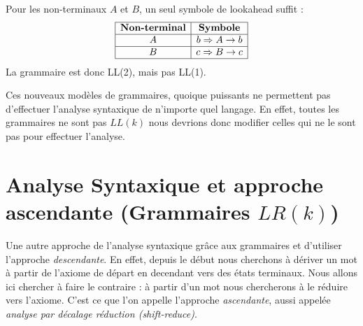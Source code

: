 \begin{example}
        Pour les non-terminaux $A$ et $B$, un seul symbole de lookahead suffit :
        \[
            \begin{array}{|c|c|}
                \hline
                \textbf{Non-terminal} & \textbf{Symbole} \\
                \hline
                A & b \Rightarrow A \to b \\
                \hline
                B & c \Rightarrow B \to c \\
                \hline
            \end{array}
        \]
    La grammaire est donc {LL(2)}, mais pas LL(1).
\end{example}

Ces nouveaux modèles de grammaires, quoique puissants ne permettent pas d'effectuer l'analyse syntaxique 
de n'importe quel langage. En effet, toutes les grammaires ne sont pas $LL(k)$ nous devrions donc 
modifier celles qui ne le sont pas pour effectuer l'analyse. 

\section{Analyse Syntaxique et approche ascendante (Grammaires $LR(k)$)}

Une autre approche de l'analyse syntaxique grâce aux grammaires et d'utiliser l'approche \emph{descendante}.
En effet, depuis le début nous cherchons à dériver un mot à partir de l'axiome de départ en decendant 
vers des états terminaux. Nous allons ici chercher à faire le contraire : à partir d'un mot nous chercherons 
à le réduire vers l'axiome. C'est ce que l'on appelle l'approche \emph{ascendante}, aussi appelée 
\emph{analyse par décalage réduction (shift-reduce)}. 


